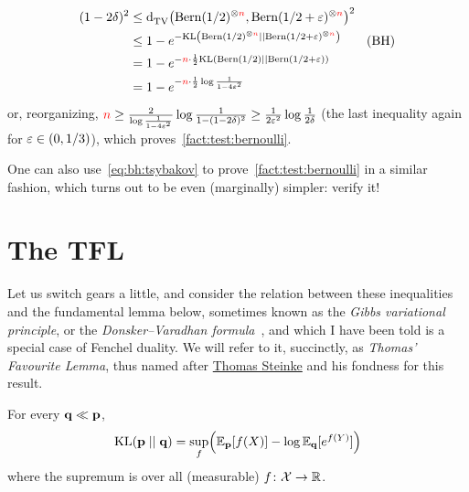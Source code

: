 \documentclass[10pt]{article}
\begin{document}
\begin{align*}
    (1-2\delta)^2 
    &\leq \totalvardist{\bernoulli{1/2}^{\otimes\ns}}{\bernoulli{1/2+\eps}^{\otimes\ns}}^2    \\
    &\leq 1- e^{-\kldiv{\bernoulli{1/2}^{\otimes\ns}}{\bernoulli{1/2+\eps}^{\otimes\ns}}}  \tag{BH}\\
    &= 1-e^{-\ns\cdot \frac{1}{2}\kldiv{\bernoulli{1/2}}{\bernoulli{1/2+\eps}}}  \\
    &= 1-e^{-\ns\cdot \frac{1}{2}\log\frac{1}{1-4\eps^2}}
\end{align*}
or, reorganizing, ${\textcolor{red}{n}}\geq \frac{2}{\log\frac{1}{1-4\varepsilon^2}}\log\frac{1}{1-(1-2\delta)^2} \geq \frac{1}{2\varepsilon^2}\log\frac{1}{2\delta}$ (the last inequality again for $\varepsilon\in(0,1/3)$), which proves~\autoref{fact:test:bernoulli}.

\begin{remark}
  One can also use~\eqref{eq:bh:tsybakov} to prove~\autoref{fact:test:bernoulli} in a similar fashion, which turns out to be even (marginally) simpler: verify it!
\end{remark}

\section{The TFL}
  \label{sec:tfl}
Let us switch gears a little, and consider the relation between these inequalities and the fundamental lemma below, sometimes known as the \emph{Gibbs variational principle}, or the \emph{Donsker--Varadhan formula}~\cite{DonskerV75}, and which I have been told is a special case of Fenchel duality. We will refer to it, succinctly, as \emph{Thomas' Favourite Lemma}, thus named after \href{http://www.thomas-steinke.net/}{Thomas Steinke} and his fondness for this result.
\begin{lemma}
  \label{lemma:tfl}
For every $\mathbf{q}\ll\mathbf{p}$, 
\[
    \kldiv{\p}{\q} = \sup_f \mleft( \shortexpect_{\p}[f(X)] - \log \shortexpect_{\q}[e^{f(Y)}] \mright)
\]
where the supremum is over all (measurable) $f\colon\mathcal{X}\to\mathbb{R}$.
\end{lemma}
\end{document}
